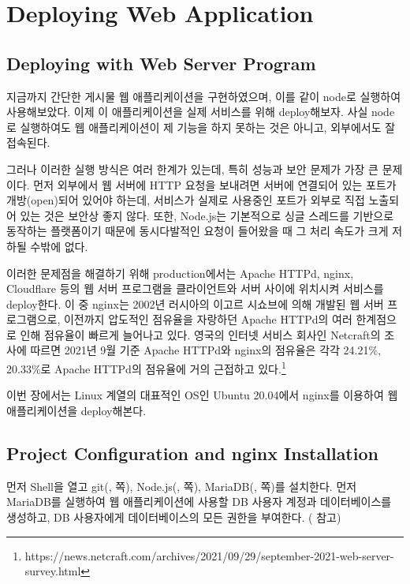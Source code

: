 \section{Deploying Web Application}\label{sect:deploying-web-application}

\subsection*{Deploying with Web Server Program}

지금까지 간단한 게시물 웹 애플리케이션을 구현하였으며, 이를 \와 같이 node로 실행하여 사용해보았다. 이제 이 애플리케이션을 실제 서비스를 위해 deploy해보자. 사실 node로 실행하여도 웹 애플리케이션이 제 기능을 하지 못하는 것은 아니고, 외부에서도 잘 접속된다.

그러나 이러한 실행 방식은 여러 한계가 있는데, 특히 성능과 보안 문제가 가장 큰 문제이다. 먼저 외부에서 웹 서버에 HTTP 요청을 보내려면 서버에 연결되어 있는 포트가 개방(open)되어 있어야 하는데, 서비스가 실제로 사용중인 포트가 외부로 직접 노출되어 있는 것은 보안상 좋지 않다. 또한, Node.js는 기본적으로 싱글 스레드를 기반으로 동작하는 플랫폼이기 때문에 동시다발적인 요청이 들어왔을 때 그 처리 속도가 크게 저하될 수밖에 없다.

이러한 문제점을 해결하기 위해 production에서는 Apache HTTPd, nginx, Cloudflare 등의 웹 서버 프로그램을 클라이언트와 서버 사이에 위치시켜 서비스를 deploy한다. 이 중 nginx는 2002년 러시아의 이고르 시쇼브에 의해 개발된 웹 서버 프로그램으로, 이전까지 압도적인 점유율을 자랑하던 Apache HTTPd의 여러 한계점으로 인해 점유율이 빠르게 늘어나고 있다. 영국의 인터넷 서비스 회사인 Netcraft의 조사에 따르면 2021년 9월 기준 Apache HTTPd와 nginx의 점유율은 각각 24.21\%, 20.33\%로 Apache HTTPd의 점유율에 거의 근접하고 있다.\footnote{https://news.netcraft.com/archives/2021/09/29/september-2021-web-server-survey.html}

이번 장에서는 Linux 계열의 대표적인 OS인 Ubuntu 20.04에서 nginx를 이용하여 웹 애플리케이션을 deploy해본다.

\subsection*{Project Configuration and nginx Installation}

먼저 Shell을 열고 git(, \pageref{shell:git-install-ubuntu}쪽), Node.js(, \pageref{shell:nodejs-linux-install}쪽), MariaDB(, \pageref{shell:mariadb-installation-ubuntu}쪽)를 설치한다. 먼저 MariaDB를 실행하여 웹 애플리케이션에 사용할 DB 사용자 계정과 데이터베이스를 생성하고, DB 사용자에게 데이터베이스의 모든 권한을 부여한다. ( 참고)

